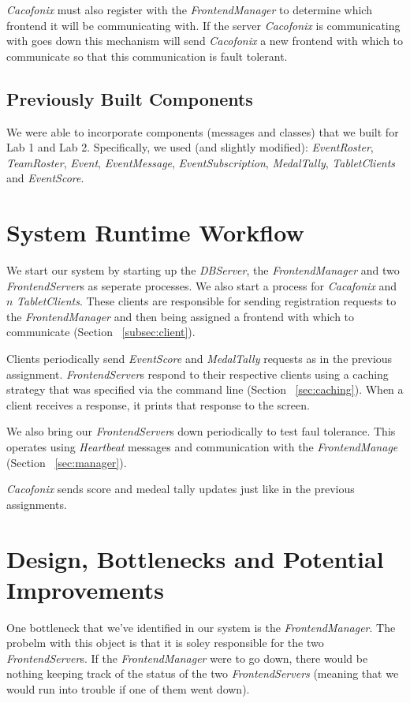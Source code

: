 \documentclass[11pt]{article}
\begin{document}
\emph{Cacofonix} must also register with the \emph{FrontendManager} to
determine which frontend it will be communicating with. If the server
\emph{Cacofonix} is communicating with goes down this mechanism will
send \emph{Cacofonix} a new frontend with which to communicate so that
this communication is fault tolerant.

\subsection{Previously Built Components}
We were able to incorporate components (messages and classes) that we
built for Lab 1 and Lab 2.  Specifically, we used (and slightly
modified): \emph{EventRoster}, \emph{TeamRoster}, \emph{Event},
\emph{EventMessage}, \emph{EventSubscription}, \emph{MedalTally},
\emph{TabletClients} and \emph{EventScore}.

\section{System Runtime Workflow}
We start our system by starting up the \emph{DBServer}, the
\emph{FrontendManager} and two \emph{FrontendServer}s as seperate
processes.  We also start a process for \emph{Cacafonix} and $n$
\emph{TabletClients}.  These clients are responsible for sending
registration requests to the \emph{FrontendManager} and then being
assigned a frontend with which to communicate (Section
~\ref{subsec:client}).

Clients periodically send \emph{EventScore} and \emph{MedalTally}
requests as in the previous assignment. \emph{FrontendServer}s respond
to their respective clients using a caching strategy that was
specified via the command line (Section ~\ref{sec:caching}). When a
client receives a response, it prints that response to the screen.

We also bring our \emph{FrontendServer}s down periodically to test
faul tolerance. This operates using \emph{Heartbeat} messages and
communication with the \emph{FrontendManage} (Section
~\ref{sec:manager}).

\emph{Cacofonix} sends score and medeal tally updates just like in the
previous assignments.

\section{Design, Bottlenecks and Potential Improvements}
One bottleneck that we've identified in our system is the
\emph{FrontendManager}.  The probelm with this object is that it is
soley responsible for the two \emph{FrontendServer}s.  If the
\emph{FrontendManager} were to go down, there would be nothing keeping
track of the status of the two \emph{FrontendServers} (meaning that we
would run into trouble if one of them went down).
\end{document}
